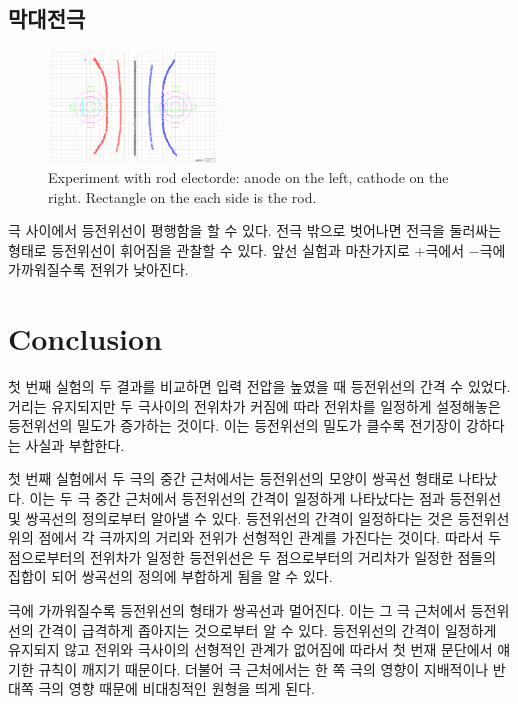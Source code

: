 \documentclass[a4paper]{article}
\begin{document}
	\subsection{막대전극}

		\begin{figure}[h]
			\begin{center}
				\includegraphics[width=0.4\textwidth]{img/electircfield-3.png}
				\caption{Experiment with rod electorde: anode on the left, cathode on the right. Rectangle on the each side is the rod. } \label{fig:fig4}
			\end{center}
		\end{figure}

		극 사이에서 등전위선이 평행함을 할 수 있다. 전극 밖으로 벗어나면 전극을 둘러싸는 형태로 등전위선이 휘어짐을 관찰할 수 있다. 
		앞선 실험과 마찬가지로 $+$극에서 $-$극에 가까워질수록 전위가 낮아진다.

\section{Conclusion}
	
	첫 번째 실험의 두 결과를 비교하면 입력 전압을 높였을 때 등전위선의 간격 수 있었다. 
	거리는 유지되지만 두 극사이의 전위차가 커짐에 따라 전위차를 일정하게 설정해놓은 등전위선의 밀도가 증가하는 것이다. 
	이는 등전위선의 밀도가 클수록 전기장이 강하다는 사실과 부합한다.

	첫 번째 실험에서 두 극의 중간 근처에서는 등전위선의 모양이 쌍곡선 형태로 나타났다. 이는 두 극 중간 근처에서 등전위선의 간격이 일정하게 나타났다는 점과 등전위선 및 쌍곡선의 정의로부터 알아낼 수 있다. 
	등전위선의 간격이 일정하다는 것은 등전위선 위의 점에서 각 극까지의 거리와 전위가 선형적인 관계를 가진다는 것이다. 
	따라서 두 점으로부터의 전위차가 일정한 등전위선은 두 점으로부터의 거리차가 일정한 점들의 집합이 되어 쌍곡선의 정의에 부합하게 됨을 알 수 있다.

	극에 가까워질수록 등전위선의 형태가 쌍곡선과 멀어진다. 
	이는 그 극 근처에서 등전위선의 간격이 급격하게 좁아지는 것으로부터 알 수 있다. 등전위선의 간격이 일정하게 유지되지 않고 전위와 극사이의 선형적인 관계가 없어짐에 따라서 첫 번재 문단에서 얘기한 규칙이 깨지기 때문이다. 
	더불어 극 근처에서는 한 쪽 극의 영향이 지배적이나 반대쪽 극의 영향 때문에 비대칭적인 원형을 띄게 된다.
\end{document}
